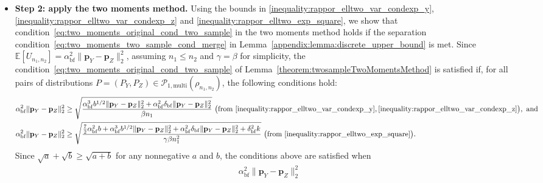 \documentclass[twoside,11pt]{article}
\newcommand{\rvTwo}{Y}
\newcommand{\rvThree}{Z}
\newcommand{\mE}{\mathbb{E}} %
\newcommand{\normSqMultinomMax}{b}
\newcommand{\alphabetSize}{k} %
\newcommand{\sampleSize}{n}
\newcommand{\probVec}{\mathbf{p}} %
\newcommand{\privacyParameter}{\alpha} %
\newcommand{\privacyParameterrappor}{\privacyParameter_{\mathrm{bf}}}
\newcommand{\maxErrorTypeTwo}{\beta} %
\newcommand{\maxErrorTypeOne}{\gamma} %
\newcommand{\smallNumber}{\delta}
\newcommand{\smallNumberrappor}{\smallNumber_{\mathrm{bf}}}
\begin{document}
\begin{appendix}
\begin{itemize}
	
	\item \textbf{Step 2: apply the two moments method.}
	Using the bounds in
	\eqref{inequality:rappor_elltwo_var_condexp_y}, 
	\eqref{inequality:rappor_elltwo_var_condexp_z} 
	and
	\eqref{inequality:rappor_elltwo_exp_square},
	we show that condition~\eqref{eq:two_moments_original_cond_two_sample} in the two moments method holds if the separation condition~\eqref{eq:two_moments_two_sample_cond_merge} in Lemma~\ref{appendix:lemma:discrete_upper_bound} is met.
	Since $\mE[U_{n_1, n_2}]=
	\privacyParameterrappor^2 \|
	\probVec_\rvTwo - \probVec_\rvThree
	\|_2^2$, assuming $\sampleSize_1 \leq \sampleSize_2$ and $\maxErrorTypeOne = \maxErrorTypeTwo$ for simplicity, the condition~\eqref{eq:two_moments_original_cond_two_sample} of Lemma~\ref{theorem:twosampleTwoMomentsMethod} is satisfied if, 	for all pairs of distributions $P = (P_{Y}, P_{Z}) \in \mathcal{P}_{1,\mathrm{multi}}(\rho_{\sampleSize_1,\sampleSize_2})$, the following conditions hold:
	\begin{align*}
		\privacyParameterrappor^2 \| \probVec_\rvTwo - \probVec_\rvThree \|_2^2
		&\geq
		\sqrt{ %
			\frac{ %
				\privacyParameterrappor^3
				\normSqMultinomMax^{1/2}
				\| \probVec_\rvTwo - \probVec_\rvThree \|_2^2
				+
				\privacyParameterrappor^2
				\smallNumberrappor		
				\| \probVec_\rvTwo - \probVec_\rvThree \|_2^2
			}{
				\beta \sampleSize_1}
		}~\bigl(\text{from}~\eqref{inequality:rappor_elltwo_var_condexp_y}, 
		\eqref{inequality:rappor_elltwo_var_condexp_z}\bigr),~\text{and} 
		\\
		\privacyParameterrappor^2 \| \probVec_\rvTwo - \probVec_\rvThree \|_2^2
		&\geq
		\sqrt{
			\frac{
				\frac{7}{2}
				\privacyParameterrappor^2 \normSqMultinomMax
				+
				\privacyParameterrappor^3
				\normSqMultinomMax^{1/2}
				\|\probVec_{\rvTwo} - \probVec_{\rvThree}\|_2^2
				+
				\privacyParameterrappor^2
				\smallNumberrappor
				\|\probVec_{\rvTwo} - \probVec_{\rvThree}\|_2^2
				+
				\smallNumberrappor^2 \alphabetSize
			}{ \gamma \beta \sampleSize_1^2}}	~\bigl(\text{from}~\eqref{inequality:rappor_elltwo_exp_square}\bigr).
	\end{align*}
	Since $\sqrt{a} + \sqrt{b} \geq \sqrt{a+b}$ for any nonnegative $a$ and $b$, the conditions above are satisfied when%
	\begin{align*}
		\privacyParameterrappor^2 \| \probVec_\rvTwo - \probVec_\rvThree \|_2^2

\end{align*}
\end{itemize}
\end{appendix}
\end{document}
